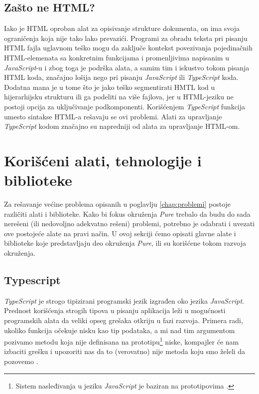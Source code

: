 \documentclass[12pt,oneside]{memoir}
\begin{document}
\subsection{Zašto ne HTML?}
Iako je HTML oproban alat za opisivanje strukture dokumenta, on ima svoja ograničenja koja nije tako lako prevazići.
Programi za obradu teksta pri pisanju HTML fajla uglavnom teško mogu da zaključe kontekst povezivanja
pojedinačnih HTML-elemenata sa konkretnim funkcijama i promenljivima napisanim u \emph{JavaScript}-u i zbog toga je podrška alata,
a samim tim i iskustvo tokom pisanja HTML koda, značajno lošija nego pri pisanju \emph{JavaScript} ili \emph{TypeScript} koda.
Dodatna mana je u tome što je jako teško segmentirati HMTL kod u hijerarhijsku strukturu ili ga podeliti na više fajlova,
jer u HTML-jeziku ne postoji opcija za uključivanje podkomponenti.
Korišćenjem \emph{TypeScript} funkcija umesto sintakse HTML-a rešavaju se ovi problemi.
Alati za upravljanje \emph{TypeScript} kodom značajno su napredniji od alata za upravljanje HTML-om.

\section{Korišćeni alati, tehnologije i biblioteke}
Za rešavanje većine problema opisanih u poglavlju \ref{chap:problemi} postoje različiti alati i biblioteke. 
Kako bi fokus okruženja \emph{Pure} trebalo da budu do sada nerešeni (ili nedovoljno adekvatno rešeni) problemi,
potrebno je odabrati i uvezati ove postojeće alate na pravi način. U ovoj sekciji ćemo opisati glavne
alate i biblioteke koje predstavljaju deo okruženja \emph{Pure}, ili su korišćene tokom razvoja okruženja.

\subsection{Typescript}
\emph{TypeScript} je strogo tipizirani programski jezik izgrađen oko jezika \emph{JavaScript}.
Prednost korišćenja strogih tipova u pisanju aplikacija leži u mogućnosti programskih alata
da veliki opseg grešaka otkriju u fazi razvoja. Primera radi, ukoliko funkcija očekuje nisku
kao tip podataka, a mi nad tim argumentom pozivamo metodu koja nije definisana na
prototipu\footnote{Sistem nasleđivanja u jeziku \emph{JavaScript}
je baziran na prototipovima \cite{PrototypeInheritance}.} niske,
kompajler će nam izbaciti grešku i upozoriti nas da to (verovatno) nije metoda koju smo želeli da pozovemo \cite{PrototypeInheritance}.
\end{document}
